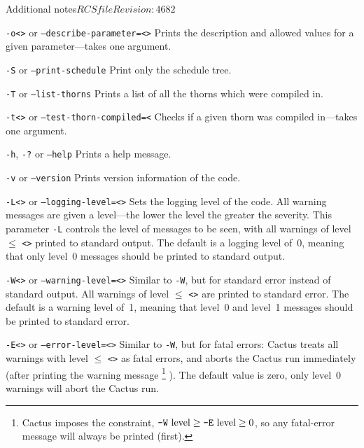 \begin{cactuspart}{Additional notes}{$RCSfile$}{$Revision: 4682 $}
\begin{Lentry}
\item [\texttt{-o<\var{param}>} or \texttt{--describe-parameter=<\var{param}>}]
Prints the description and allowed values for a given parameter---takes one
argument.

\item [\texttt{-S} or \texttt{--print-schedule}]
Print only the schedule tree.

\item [\texttt{-T} or \texttt{--list-thorns}]
Prints a list of all the thorns which were compiled in.

\item [\texttt{-t<\var{arrangement or thorn}>} or \texttt{--test-thorn-compiled=<\var{arrangement or thorn>}} ]
Checks if a given thorn was compiled in---takes one argument.

\item [\texttt{-h}, \texttt{-?} or \texttt{--help}]
Prints a help message.

\item [\texttt{-v} or \texttt{--version}]
Prints version information of the code.


\item [\texttt{-L<\var{level}>} or \texttt{--logging-level=<\var{level}>}]
Sets the logging level of the code.  All warning messages are given a
level---the lower the level the greater the severity.  This
parameter \texttt{-L} controls the level of messages to be seen, with all
warnings of level $\le$ \texttt{<>} printed to standard output.  The
default is a logging level of~0, meaning that only level~0 messages
should be printed to standard output.

\item [\texttt{-W<\var{level}>} or \texttt{--warning-level=<\var{level}>}]
Similar to \texttt{-W}, but for standard error instead of
standard output.  All warnings of level $\le$ \texttt{<>} are
printed to standard error.  The default is a warning level of~1,
meaning that level~0 and level~1 messages should be printed to
standard error.

\item [\texttt{-E<\var{level}>} or \texttt{--error-level=<\var{level}>}]
Similar to \texttt{-W}, but for fatal errors: Cactus treats all
warnings with level $\le$ \texttt{<>} as fatal errors, and aborts
the Cactus run immediately (after printing the warning message%
\footnote{%
         Cactus imposes the constraint,
         $\hbox{\texttt{-W} level} \ge \hbox{\texttt{-E} level} \ge 0$,
         so any fatal-error message will always be printed (first).
         }%
).  The default value is zero, \ie{} only level~0 warnings
will abort the Cactus run.


\end{Lentry}
\end{cactuspart}

